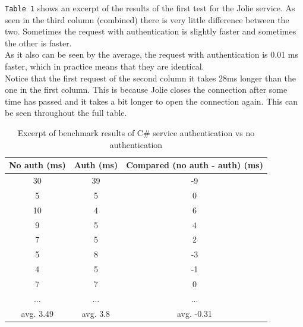 \documentclass[12pt,a4paper]{article}
\begin{document}
\texttt{Table 1} shows an excerpt of the results of the first test for the Jolie service. As seen in the third column (combined) there is very little difference between the two. Sometimes the request with authentication is slightly faster and sometimes the other is faster.\\
As it also can be seen by the average, the request with authentication is 0.01 ms faster, which in practice means that they are identical.\\
Notice that the first request of the second column it takes 28ms longer than the one in the first column. This is because Jolie closes the connection after some time has passed and it takes a bit longer to open the connection again. This can be seen throughout the full table.

\newpage
\begin{table}[h!]
\begin{center}
\begin{tabular}{ | c | c | c | }
\hline
No auth (ms) & Auth (ms) & Compared (no auth - auth) (ms) \\ \hline
 30  &  39  &  -9  \\ \hline                                                                                                                                                                                 
  5  &   5  &   0  \\ \hline                                                                                                                                                                                 
 10  &   4  &   6  \\ \hline                                                                                                                                                                                 
  9  &   5  &   4  \\ \hline                                                                                                                                                                                 
  7  &   5  &   2  \\ \hline                                                                                                                                                                                 
  5  &   8  &  -3  \\ \hline                                                                                                                                                                                 
  4  &   5  &  -1  \\ \hline                                                                                                                                                                                 
  7  &   7  &   0  \\ \hline
  ... & ... & ... \\ \hline
  avg. 3.49 & avg. 3.8 & avg. -0.31 \\ \hline 
\end{tabular}
\label{table:winAuthResults}
\caption{Excerpt of benchmark results of C\# service authentication vs no authentication}
\end{center}
\end{table}
\end{document}

